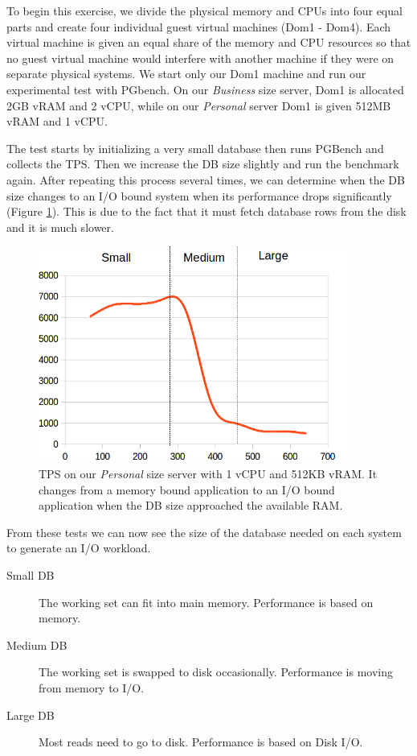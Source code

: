To begin this exercise, we divide the physical memory and CPUs into four equal parts and create four individual guest virtual machines (Dom1 - Dom4).  
Each virtual machine is given an equal share of the memory and CPU resources so that no guest virtual machine would interfere with another machine if they were on separate physical systems.  
We start only our Dom1 machine and run our experimental test with PGbench.  
On our \emph{Business} size server, Dom1 is allocated 2GB vRAM and 2 vCPU, while on our \emph{Personal} server Dom1 is given 512MB vRAM and 1 vCPU.  

The test starts by initializing a very small database then runs PGBench and collects the TPS.  
Then we increase the DB size slightly and run the benchmark again.  
After repeating this process several times, we can determine when the DB size changes to an I/O bound system when its performance drops significantly (Figure \ref{smallIO}).  
This is due to the fact that it must fetch database rows from the disk and it is much slower.  

\begin{figure}[!h]
  \begin{center}
  \includegraphics[width=4in]{images/SmallScale.png}
  \caption{TPS on our \emph{Personal} size server with 1 vCPU and 512KB vRAM. It changes from a memory bound application to an I/O bound application when the DB size approached the available RAM.}
  \label{smallIO}
  \end{center}
\end{figure}

From these tests we can now see the size of the database needed on each system to generate an I/O workload. 
\begin{description}
  \item[Small DB] The working set can fit into main memory.  Performance is based on memory.
  \item[Medium DB] The working set is swapped to disk occasionally. Performance is moving from memory to I/O.
  \item[Large DB] Most reads need to go to disk.  Performance is based on Disk I/O.
\end{description}

